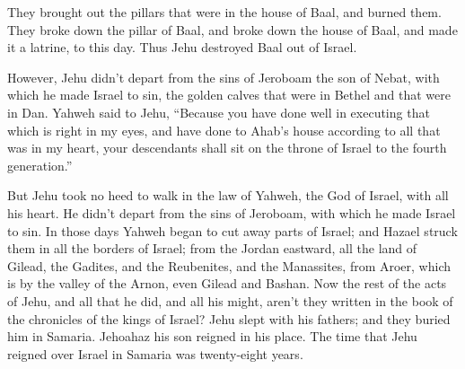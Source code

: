 {They brought out the pillars that were in the house of Baal, and burned them.
They broke down the pillar of Baal, and broke down the house of Baal, and made it a latrine, to this day.
Thus Jehu destroyed Baal out of Israel.
\par }{\PP {}However, Jehu didn’t depart from the sins of Jeroboam the son of Nebat, with which he made Israel to sin, the golden calves that were in Bethel and that were in Dan.
Yahweh said to Jehu, “Because you have done well in executing that which is right in my eyes, and have done to Ahab’s house according to all that was in my heart, your descendants shall sit on the throne of Israel to the fourth generation.”
\par }{\PP {}But Jehu took no heed to walk in the law of Yahweh, the God of Israel, with all his heart. He didn’t depart from the sins of Jeroboam, with which he made Israel to sin.
In those days Yahweh began to cut away parts of Israel; and Hazael struck them in all the borders of Israel;
from the Jordan eastward, all the land of Gilead, the Gadites, and the Reubenites, and the Manassites, from Aroer, which is by the valley of the Arnon, even Gilead and Bashan.
Now the rest of the acts of Jehu, and all that he did, and all his might, aren’t they written in the book of the chronicles of the kings of Israel?
Jehu slept with his fathers; and they buried him in Samaria. Jehoahaz his son reigned in his place.
The time that Jehu reigned over Israel in Samaria was twenty-eight years.

}
